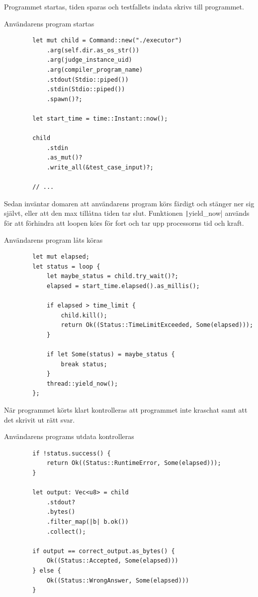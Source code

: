 \documentclass{article}
\begin{document}
Programmet startas, tiden sparas
och testfallets indata skrivs till programmet.

\begin{listing}[H]
	\caption{Användarens program startas}
	\begin{verbatim}
		let mut child = Command::new("./executor")
			.arg(self.dir.as_os_str())
			.arg(judge_instance_uid)
			.arg(compiler_program_name)
			.stdout(Stdio::piped())
			.stdin(Stdio::piped())
			.spawn()?;

		let start_time = time::Instant::now();

		child
			.stdin
			.as_mut()?
			.write_all(&test_case_input)?;

		// ...
	\end{verbatim}
\end{listing}

Sedan inväntar domaren att användarens program körs färdigt och stänger ner sig
självt, eller att den max tillåtna tiden tar slut. Funktionen
\texttt|yield_now| används för att förhindra att loopen
körs för fort och tar upp processorns tid och kraft.

\begin{listing}[H]
	\caption{Användarens program låts köras}
	\begin{verbatim}
		let mut elapsed;
		let status = loop {
			let maybe_status = child.try_wait()?;
			elapsed = start_time.elapsed().as_millis();

			if elapsed > time_limit {
				child.kill();
				return Ok((Status::TimeLimitExceeded, Some(elapsed)));
			}

			if let Some(status) = maybe_status {
				break status;
			}
			thread::yield_now();
		};
	\end{verbatim}
\end{listing}

När programmet körts klart kontrolleras att programmet inte kraschat samt att
det skrivit ut rätt svar.

\begin{listing}[H]
	\caption{Användarens programs utdata kontrolleras}
	\begin{verbatim}
		if !status.success() {
			return Ok((Status::RuntimeError, Some(elapsed)));
		}

		let output: Vec<u8> = child
			.stdout?
			.bytes()
			.filter_map(|b| b.ok())
			.collect();

		if output == correct_output.as_bytes() {
			Ok((Status::Accepted, Some(elapsed)))
		} else {
			Ok((Status::WrongAnswer, Some(elapsed)))
		}
	\end{verbatim}
\end{listing}
\end{document}
